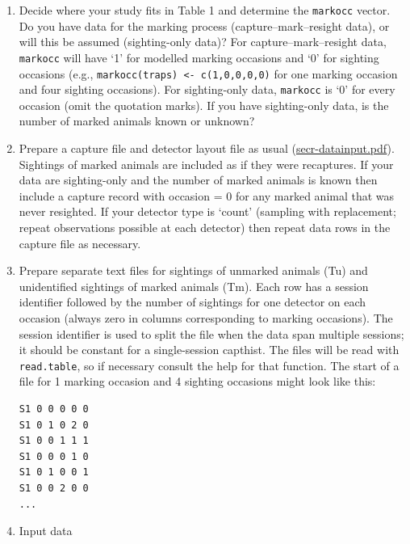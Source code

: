 \documentclass[
]{book}
\begin{document}
\begin{enumerate}
\def\labelenumi{\arabic{enumi}.}
\item
  Decide where your study fits in Table 1 and determine the \texttt{markocc} vector. Do you have data for the marking process (capture--mark--resight data), or will this be assumed (sighting-only data)? For capture--mark--resight data, \texttt{markocc} will have `1' for modelled marking occasions and `0' for sighting occasions (e.g., \texttt{markocc(traps)\ \textless{}-\ c(1,0,0,0,0)} for one marking occasion and four sighting occasions). For sighting-only data, \texttt{markocc} is `0' for every occasion (omit the quotation marks). If you have sighting-only data, is the number of marked animals known or unknown?
\item
  Prepare a capture file and detector layout file as usual (\href{https://www.otago.ac.nz/density/pdfs/secr-datainput.pdf}{secr-datainput.pdf}). Sightings of marked animals are included as if they were recaptures. If your data are sighting-only and the number of marked animals is known then include a capture record with occasion = 0 for any marked animal that was never resighted. If your detector type is `count' (sampling with replacement; repeat observations possible at each detector) then repeat data rows in the capture file as necessary.
\item
  Prepare separate text files for sightings of unmarked animals (Tu) and unidentified sightings of marked animals (Tm). Each row has a session identifier followed by the number of sightings for one detector on each occasion (always zero in columns corresponding to marking occasions). The session identifier is used to split the file when the data span multiple sessions; it should be constant for a single-session capthist. The files will be read with \texttt{read.table}, so if necessary consult the help for that function. The start of a file for 1 marking occasion and 4 sighting occasions might look like this:

\begin{verbatim}
S1 0 0 0 0 0  
S1 0 1 0 2 0  
S1 0 0 1 1 1  
S1 0 0 0 1 0  
S1 0 1 0 0 1  
S1 0 0 2 0 0  
...  
\end{verbatim}
\item
  Input data
\end{enumerate}
\end{document}
